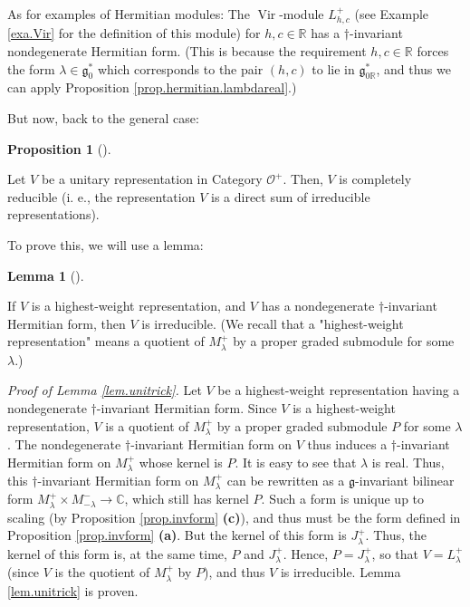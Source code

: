 \documentclass
[numbers=enddot,12pt,final,onecolumn,german,notitlepage]{scrartcl}%
\theoremstyle{definition}
\newtheorem{lem}[theo]{Lemma}
\newenvironment{lemma}[1][]
{\begin{lem}[#1]\begin{leftbar}}
{\end{leftbar}\end{lem}}
\newtheorem{prop}[theo]{Proposition}
\newenvironment{proposition}[1][]
{\begin{prop}[#1]\begin{leftbar}}
{\end{leftbar}\end{prop}}
\begin{document}
As for examples of Hermitian modules: The $\operatorname*{Vir}$-module
$L_{h,c}^{+}$ (see Example \ref{exa.Vir} for the definition of this module)
for $h,c\in\mathbb{R}$ has a $\dag$-invariant nondegenerate Hermitian form.
(This is because the requirement $h,c\in\mathbb{R}$ forces the form
$\lambda\in\mathfrak{g}_{0}^{\ast}$ which corresponds to the pair $\left(
h,c\right)  $ to lie in $\mathfrak{g}_{0\mathbb{R}}^{\ast}$, and thus we can
apply Proposition \ref{prop.hermitian.lambdareal}.)

But now, back to the general case:

\begin{proposition}
\label{prop.unitrick}Let $V$ be a unitary representation in Category
$\mathcal{O}^{+}$. Then, $V$ is completely reducible (i. e., the
representation $V$ is a direct sum of irreducible representations).
\end{proposition}

To prove this, we will use a lemma:

\begin{lemma}
\label{lem.unitrick}If $V$ is a highest-weight representation, and $V$ has a
nondegenerate $\dag$-invariant Hermitian form, then $V$ is irreducible. (We
recall that a "highest-weight representation" means a quotient of $M_{\lambda
}^{+}$ by a proper graded submodule for some $\lambda$.)
\end{lemma}

\textit{Proof of Lemma \ref{lem.unitrick}.} Let $V$ be a highest-weight
representation having a nondegenerate $\dag$-invariant Hermitian form. Since
$V$ is a highest-weight representation, $V$ is a quotient of $M_{\lambda}^{+}$
by a proper graded submodule $P$ for some $\lambda$. The nondegenerate $\dag
$-invariant Hermitian form on $V$ thus induces a $\dag$-invariant Hermitian
form on $M_{\lambda}^{+}$ whose kernel is $P$. It is easy to see that
$\lambda$ is real. Thus, this $\dag$-invariant Hermitian form on $M_{\lambda
}^{+}$ can be rewritten as a $\mathfrak{g}$-invariant bilinear form
$M_{\lambda}^{+}\times M_{-\lambda}^{-}\rightarrow\mathbb{C}$, which still has
kernel $P$. Such a form is unique up to scaling (by Proposition
\ref{prop.invform} \textbf{(c)}), and thus must be the form defined in
Proposition \ref{prop.invform} \textbf{(a)}. But the kernel of this form is
$J_{\lambda}^{+}$. Thus, the kernel of this form is, at the same time, $P$ and
$J_{\lambda}^{+}$. Hence, $P=J_{\lambda}^{+}$, so that $V=L_{\lambda}^{+}$
(since $V$ is the quotient of $M_{\lambda}^{+}$ by $P$), and thus $V$ is
irreducible. Lemma \ref{lem.unitrick} is proven.
\end{document}

